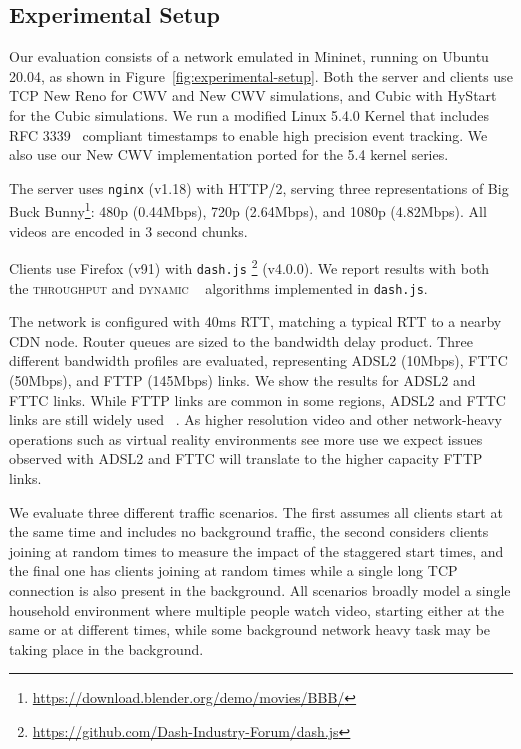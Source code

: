 \documentclass[10pt, acmlarge]{acmart}
\begin{document}
\subsection{Experimental Setup}
\label{sec:experimental-setup}

Our evaluation consists of a network emulated in Mininet, running on Ubuntu 20.04, 
as shown in Figure~\ref{fig:experimental-setup}. Both the server and clients use TCP New Reno
for CWV and New CWV simulations, and Cubic with HyStart for the Cubic simulations. We run a 
modified Linux 5.4.0 Kernel that includes RFC 
3339~\cite{rfc3339-precise-timestamps} compliant timestamps to enable high precision event 
tracking. We also use our New CWV implementation ported for the 5.4 kernel series.

The server uses \texttt{nginx} (v1.18) with HTTP/2, serving three representations of 
Big Buck Bunny\footnote{\url{https://download.blender.org/demo/movies/BBB/}}: 
480p (0.44Mbps), 720p (2.64Mbps), and 1080p (4.82Mbps). All videos are encoded in 3 second chunks.

Clients use Firefox (v91) with \texttt{dash.js}
\footnote{\url{https://github.com/Dash-Industry-Forum/dash.js}} (v4.0.0). We
report results with both the \textsc{throughput} and \textsc{dynamic}
~\cite{Spiteri-2019-from-theory-to-practice-sabre} algorithms implemented in \texttt{dash.js}.

The network is configured with 40ms RTT, matching a typical RTT to a nearby CDN node.
Router queues are sized to the bandwidth delay product. Three different bandwidth profiles 
are evaluated, representing ADSL2 (10Mbps), FTTC (50Mbps), and FTTP (145Mbps) links. 
We show the results for ADSL2 and FTTC links.
While FTTP links are common in some regions, ADSL2 and FTTC links are still widely used
~\cite{ofcom-2020-report,FCC-measuring-broadband-america,EC-measuring-broadband-europe,
ACCC-measuring-broadband-australia}. As higher resolution video and other network-heavy 
operations such as virtual reality environments see more use we expect issues observed with 
ADSL2 and FTTC will translate to the higher capacity FTTP links.

We evaluate three different traffic scenarios. The first assumes all clients start at the same
time and includes no background traffic, the second considers clients joining at random times
to measure the impact of the staggered start times, and the final one has clients joining at 
random times while a single long TCP connection is also present in the background. All
scenarios broadly model a single household environment where multiple people watch video,
starting either at the same or at different times, while some background network heavy task
may be taking place in the background.
\end{document}
